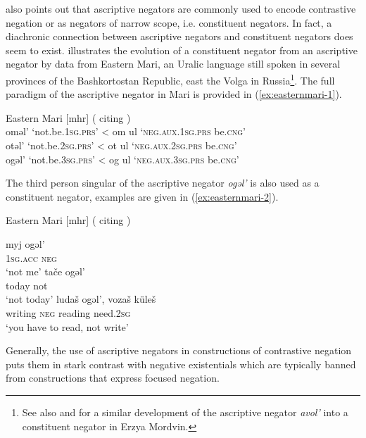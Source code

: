 \documentclass[output=paper,chinesefont,colorlinks,citecolor=brown]{langscibook}
\begin{document}
\citet{eriksen2011} also points out that ascriptive negators are commonly used to encode contrastive negation or as negators of narrow scope, i.e. constituent negators. In fact, a diachronic connection between ascriptive negators and constituent negators does seem to exist. \citet[570--571]{Veselinova2015} illustrates the evolution of a constituent negator from an ascriptive negator by data from Eastern Mari, an Uralic language still spoken in several provinces of the Bashkortostan Republic, east the Volga in Russia\footnote{See also \citet[474--475]{Hamari2013} and \citet[304, 313--3114]{HamariAasmae2015} for a similar development of the ascriptive negator \textit{avol’} into a constituent negator in Erzya Mordvin.}. The full paradigm of the ascriptive negator in Mari is provided in (\ref{ex:easternmari-1}).

\begin{exe}
\ex Eastern Mari [mhr] (\citealt[570]{Veselinova2015} citing \citealt[91]{rieseetal2010})\label{ex:easternmari-1}\\
oməl’ ‘not.be.\textsc{1sg.prs}’ < om ul ‘\textsc{neg.aux.1sg.prs} be.\textsc{cng}’\\
otəl’ ‘not.be.\textsc{2sg.prs}’ < ot ul ‘\textsc{neg.aux.2sg.prs} be.\textsc{cng}’\\
ogəl’ ‘not.be.\textsc{3sg.prs}’ < og ul ‘\textsc{neg.aux.3sg.prs} be.\textsc{cng}’\\

\end{exe}
The third person singular of the ascriptive negator \textit{ogəl’}\textit{} is also used as a constituent negator, examples are given in (\ref{ex:easternmari-2}).

\begin{exe}
\ex Eastern Mari [mhr] (\citealt[570]{Veselinova2015} citing \citealt[91]{rieseetal2010})\label{ex:easternmari-2}
\begin{xlist}
\ex \label{ex:easternmari-2a}
\gll myj ogəl’\\
\textsc{1sg.acc} \textsc{neg}\\
\glt ‘not me'
\ex \label{ex:easternmari-2b}
\gll tače ogəl’\\
today not\\
\glt ‘not today'
\ex \label{ex:easternmari-2c}
\gll ludaš ogəl’, vozaš küleš\\
writing \textsc{neg} reading need.\textsc{2sg}\\
\glt ‘you have to read, not write’
\end{xlist}
\end{exe}
Generally, the use of ascriptive negators in constructions of contrastive negation puts them in stark contrast with negative existentials which are typically banned from constructions that express focused negation.
\end{document}
